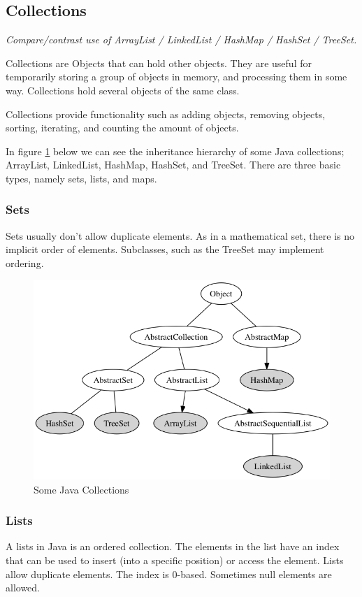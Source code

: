 \subsection{Collections}
\textit{Compare/contrast use of ArrayList / LinkedList / HashMap / HashSet / TreeSet.}

Collections are Objects that can hold other objects. They are useful for temporarily storing a group of objects in memory, and processing them in some way. Collections hold several objects of the same class. 

Collections provide functionality such as adding objects, removing objects, sorting, iterating, and counting the amount of objects.

In figure \ref{fig:collections} below we can see the inheritance hierarchy of some Java collections; ArrayList, LinkedList, HashMap, HashSet, and TreeSet. There are three basic types, namely sets, lists, and maps.

\subsubsection{Sets}
Sets usually don't allow duplicate elements. As in a mathematical set, there is no implicit order of elements. Subclasses, such as the TreeSet may implement ordering.\cite{set}
\begin{figure}[!h]\centering
\includegraphics[width=\linewidth, frame]{collections.png}
\caption{Some Java Collections}
\label{fig:collections}
\end{figure}
\subsubsection{Lists}
A lists in Java is an ordered collection. The elements in the list have an index that can be used to insert (into a specific position) or access the element. Lists allow duplicate elements. The index is 0-based. Sometimes null elements are allowed.\cite{list}

